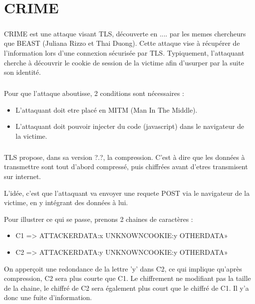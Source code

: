 \chapter{CRIME}

\paragraph{}
CRIME est une attaque visant TLS, découverte en .... par les memes chercheurs que BEAST (Juliana Rizzo et Thai Duong). Cette attaque vise à récupérer de l'information lors d'une connexion sécurisée par TLS. Typiquement, l'attaquant cherche à découvrir le cookie de session de la victime afin d'usurper par la suite son identité.

\paragraph{}
Pour que l'attaque aboutisse, 2 conditions sont nécessaires :
\begin{itemize}
  \item L'attaquant doit etre placé en MITM (Man In The Middle).
  \item L'attaquant doit pouvoir injecter du code (javascript) dans le navigateur de la victime.
\end{itemize}

\paragraph{}
TLS propose, dans sa version ?.?, la compression. C'est à dire que les données à transmettre sont tout d'abord compressé, puis chiffrées avant d'etres transmisent sur internet.

L'idée, c'est que l'attaquant va envoyer une requete POST via le navigateur de la victime, en y intégrant des données à lui.

Pour illustrer ce qui se passe, prenons 2 chaines de caractères :
\begin{itemize}
\item C1 => ATTACKERDATA:x UNKNOWNCOOKIE:y OTHERDATA»
\item C2 => ATTACKERDATA:y UNKNOWNCOOKIE:y OTHERDATA»
\end{itemize}
On apperçoit une redondance de la lettre 'y' dans C2, ce qui implique qu'après compression, C2 sera plus courte que C1. Le chiffrement ne modifiant pas la taille de la chaine, le chiffré de C2 sera également plus court que le chiffré de C1. Il y'a donc une fuite d'information.

